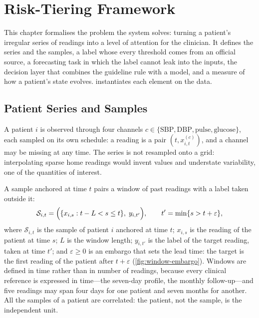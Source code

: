 \chapter{Risk-Tiering Framework}\label{ch:framework}

This chapter formalises the problem the system solves: turning a patient's irregular series of readings into a level of attention for the clinician. It defines the series and the samples, a label whose every threshold comes from an official source, a forecasting task in which the label cannot leak into the inputs, the decision layer that combines the guideline rule with a model, and a measure of how a patient's state evolves.  instantiates each element on the data.

\section{Patient Series and Samples}\label{sec:windows}\label{sec:irregular}

A patient $i$ is observed through four channels $c \in \{\mathrm{SBP}, \mathrm{DBP}, \text{pulse}, \text{glucose}\}$, each sampled on its own schedule: a reading is a pair $(t, x^{(c)}_{i,t})$, and a channel may be missing at any time. The series is not resampled onto a grid: interpolating sparse home readings would invent values and understate variability, one of the quantities of interest.

A sample anchored at time $t$ pairs a window of past readings with a label taken outside it:
\begin{equation}
  \mathcal{S}_{i,t} = \Bigl( \{x_{i,s} : t - L < s \leq t\},\; y_{i,t'} \Bigr),
  \qquad t' = \min\{ s > t + \varepsilon \},
\end{equation}
where $\mathcal{S}_{i,t}$ is the sample of patient $i$ anchored at time $t$; $x_{i,s}$ is the reading of the patient at time $s$; $L$ is the window length; $y_{i,t'}$ is the label of the target reading, taken at time $t'$; and $\varepsilon \geq 0$ is an embargo that sets the lead time: the target is the first reading of the patient after $t + \varepsilon$ (\cref{fig:window-embargo}). Windows are defined in time rather than in number of readings, because every clinical reference is expressed in time---the seven-day profile, the monthly follow-up---and five readings may span four days for one patient and seven months for another. All the samples of a patient are correlated: the patient, not the sample, is the independent unit.

